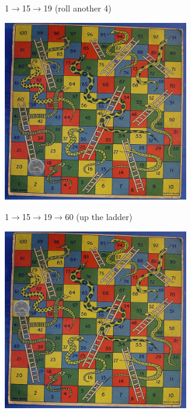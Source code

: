 \documentclass{beamer}
\begin{document}
\begin{frame}{1$\rightarrow$15$\rightarrow$19 (roll another 4)}
  \begin{center}
    \includegraphics[width=8cm]{game19.jpg}
  \end{center}
    \vfill
\tiny{}
\end{frame}


\begin{frame}{1$\rightarrow$15$\rightarrow$19$\rightarrow$60 (up the ladder)}
  \begin{center}
    \includegraphics[width=8cm]{game60.jpg}
  \end{center}
    \vfill
\tiny{}
\end{frame}
\end{document}
